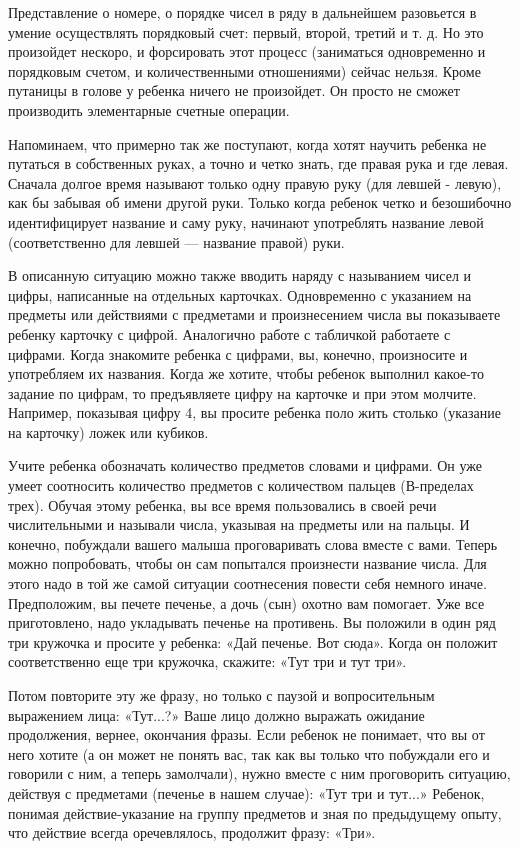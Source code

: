 \documentclass[a5paper]{book}
\begin{document}
Представление о номере, о порядке чисел в ряду в дальнейшем разовьется в
умение осуществлять порядковый счет: первый, второй, третий и т. д. Но
это произойдет нескоро, и форсировать этот процесс (заниматься
одновременно и порядковым счетом, и количественными отношениями) сейчас
нельзя. Кроме путаницы в голове у ребенка ничего не произойдет. Он
просто не сможет производить элементарные счетные операции.

Напоминаем, что примерно так же поступают, когда хотят научить ребенка
не путаться в собственных руках, а точно и четко знать, где правая рука
и где левая. Сначала долгое время называют только одну правую руку (для
левшей - левую), как бы забывая об имени другой руки. Только когда
ребенок четко и безошибочно идентифицирует название и саму руку,
начинают употреблять название левой (соответственно для левшей ---
название правой) руки.

В описанную ситуацию можно также вводить наряду с называнием чисел и
цифры, написанные на отдельных карточках. Одновременно с указанием на
предметы или действиями с предметами и произнесением числа вы
показываете ребенку карточку с цифрой. Аналогично работе с табличкой
работаете с цифрами. Когда знакомите ребенка с цифрами, вы, конечно,
произносите и употребляем их названия. Когда же хотите, чтобы ребенок
выполнил какое-то задание по цифрам, то предъявляете цифру на карточке и
при этом молчите. Например, показывая цифру 4, вы просите ребенка поло
жить столько (указание на карточку) ложек или кубиков.

Учите ребенка обозначать количество предметов словами и цифрами. Он уже
умеет соотносить количество предметов с количеством пальцев (В-пределах
трех). Обучая этому ребенка, вы все время пользовались в своей речи
числительными и называли числа, указывая на предметы или на пальцы. И
конечно, побуждали вашего малыша проговаривать слова вместе с вами.
Теперь можно попробовать, чтобы он сам попытался произнести название
числа. Для этого надо в той же самой ситуации соотнесения повести себя
немного иначе. Предположим, вы печете печенье, а дочь (сын) охотно вам
помогает. Уже все приготовлено, надо укладывать печенье на противень. Вы
положили в один ряд три кружочка и просите у ребенка: «Дай печенье. Вот
сюда». Когда он положит соответственно еще три кружочка, скажите: «Тут
три и тут три».

Потом повторите эту же фразу, но только с паузой и вопросительным
выражением лица: «Тут...?» Ваше лицо должно выражать ожидание
продолжения, вернее, окончания фразы. Если ребенок не понимает, что вы
от него хотите (а он может не понять вас, так как вы только что
побуждали его и говорили с ним, а теперь замолчали), нужно вместе с ним
проговорить ситуацию, действуя с предметами (печенье в нашем случае):
«Тут три и тут...» Ребенок, понимая действие-указание на группу
предметов и зная по предыдущему опыту, что действие всегда оречевлялось,
продолжит фразу: «Три».
\end{document}
